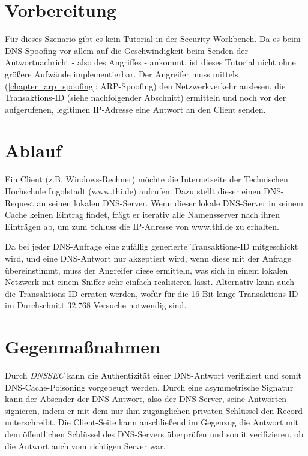 \section{Vorbereitung}
Für dieses Szenario gibt es kein Tutorial in der Security Workbench. Da es beim DNS-Spoofing vor allem auf die Geschwindigkeit beim Senden der Antwortnachricht - also des Angriffes - ankommt, ist dieses Tutorial nicht ohne größere Aufwände implementierbar. Der Angreifer muss mittels (\ref{chapter_arp_spoofing}: ARP-Spoofing) den Netzwerkverkehr auslesen, die Transaktions-ID (siehe nachfolgender Abschnitt) ermitteln und noch vor der aufgerufenen, legitimen IP-Adresse eine Antwort an den Client senden. 

\section{Ablauf}
Ein Client (z.B. Windows-Rechner) möchte die Internetseite der Technischen Hochschule Ingolstadt (www.thi.de) aufrufen. Dazu stellt dieser einen DNS-Request an seinen lokalen DNS-Server.
Wenn dieser lokale DNS-Server in seinem Cache keinen Eintrag findet, frägt er iterativ alle Namensserver nach ihren Einträgen ab, um zum Schluss die IP-Adresse von www.thi.de zu erhalten.

Da bei jeder DNS-Anfrage eine zufällig generierte Transaktions-ID mitgeschickt wird, und eine DNS-Antwort nur akzeptiert wird, wenn diese mit der Anfrage übereinstimmt, muss der Angreifer diese ermitteln, was sich in einem lokalen Netzwerk mit einem Sniffer sehr einfach realisieren lässt. Alternativ kann auch die Transaktions-ID erraten werden, wofür für die 16-Bit lange Transaktions-ID im Durchschnitt 32.768 Versuche notwendig sind.

\section{Gegenmaßnahmen}

Durch \emph{DNSSEC} kann die Authentizität einer DNS-Antwort verifiziert und somit DNS-Cache-Poisoning vorgebeugt werden. Durch eine asymmetrische Signatur kann der Absender der DNS-Antwort, also der DNS-Server, seine Antworten signieren, indem er mit dem nur ihm zugänglichen privaten Schlüssel den Record unterschreibt. Die Client-Seite kann anschließend im Gegenzug die Antwort mit dem öffentlichen Schlüssel des DNS-Servers überprüfen und somit verifizieren, ob die Antwort auch vom richtigen Server war.
